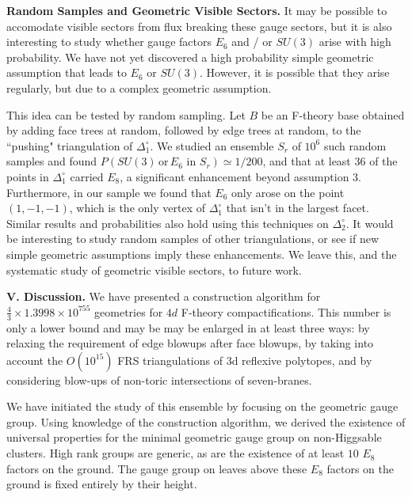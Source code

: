 \documentclass[aps,prl,twocolumn, superscriptaddress,groupedaddress,nofootinbib]{revtex4-1}
\newcommand{\sdoc}{S_{\Delta_1^\circ}}
\newcommand{\sdtc}{S_{\Delta_2^\circ}}
\newcommand{\doc}{{\Delta_1^\circ}}
\newcommand{\dtc}{{\Delta_2^\circ}}
\newcommand{\textin}{\,\, \text{in} \,\,}
\newcommand{\XXX}[3]{}
\begin{document}


\vspace{.2cm}
\noindent \textbf{Random Samples and Geometric Visible Sectors.} 
It may be possible to accomodate visible sectors from flux breaking
these gauge sectors, but it is also interesting to study whether gauge
factors $E_6$ and / or $SU(3)$ arise with high probability.
We have not yet discovered a high probability simple geometric assumption
that leads to $E_6$ or $SU(3)$. However, it is possible that they arise regularly,
but due to a complex geometric assumption.

This idea can be tested by random sampling. Let $B$ be an F-theory base obtained
by adding face trees at random, followed by edge trees at random, to the ``pushing" 
triangulation of $\doc$. We studied an ensemble $S_r$ of $10^6$ such random samples 
and found $P(SU(3) \, \text{or} \, E_6 \textin S_r)\simeq 1/200$, and that at least 
$36$ of the points in $\doc$ carried $E_8$, a significant enhancement beyond
assumption $3$.  Furthermore, in our sample we found that $E_6$ only
arose on the point $(1,-1,-1)$, which is the only vertex of $\doc$
that isn't in the largest facet.  Similar results and probabilities also hold
using this techniques on $\dtc$. It would be interesting to study random samples of other triangulations, or
see if new simple geometric assumptions imply these enhancements. We leave this,
and the systematic study of geometric visible sectors, to future work.

\vspace{.2cm}
\noindent \textbf{V. Discussion.} 
We have presented a construction algorithm for  $\frac43 \times 1.3998\times
10^{755}$ geometries for $4d$ F-theory compactifications. This number is only
a lower bound and may be may be enlarged in at least three ways: by relaxing
the requirement of edge blowups after  face blowups, by taking into account
the $O(10^{15})$ FRS triangulations of 3d reflexive polytopes, and by
considering blow-ups of non-toric intersections of seven-branes.

We have initiated the study of this ensemble by focusing on the geometric gauge group.
Using knowledge of the construction algorithm, we derived the existence of universal
properties for the minimal geometric gauge group on non-Higgsable clusters. High
rank groups are generic, as are the existence of at least $10$ $E_8$ factors on the ground.
The gauge group on leaves above these $E_8$ factors on the ground is fixed entirely by their height.
\end{document}
